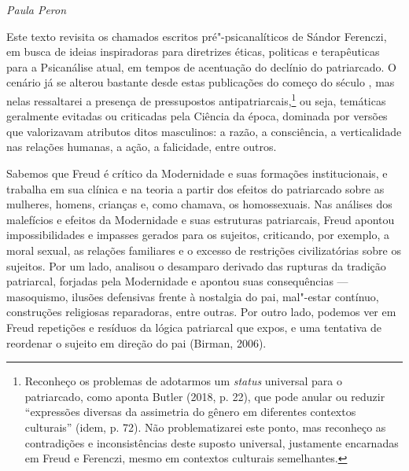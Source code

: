 \begin{flushright}
\emph{Paula Peron}
\end{flushright}

Este texto revisita os chamados escritos pré"-psicanalíticos de Sándor
Ferenczi, em busca de ideias inspiradoras para diretrizes éticas,
politicas e terapêuticas para a Psicanálise atual, em tempos de
acentuação do declínio do patriarcado. O cenário já se alterou bastante
desde estas publicações do começo do século , mas nelas ressaltarei a
presença de pressupostos antipatriarcais,\footnote{Reconheço os problemas
  de adotarmos um \emph{status} universal para o patriarcado, como
  aponta Butler (2018, p. 22), que pode anular ou reduzir ``expressões
  diversas da assimetria do gênero em diferentes contextos culturais''
  (idem, p. 72). Não problematizarei este ponto, mas reconheço as
  contradições e inconsistências deste suposto universal, justamente
  encarnadas em Freud e Ferenczi, mesmo em contextos culturais
  semelhantes.} ou seja, temáticas geralmente evitadas ou criticadas
pela Ciência da época, dominada por versões que valorizavam atributos
ditos masculinos: a razão, a consciência, a verticalidade nas relações
humanas, a ação, a falicidade, entre outros.

Sabemos que Freud é crítico da Modernidade e suas formações
institucionais, e trabalha em sua clínica e na teoria a partir dos
efeitos do patriarcado sobre as mulheres, homens, crianças e, como
chamava, os homossexuais. Nas análises dos malefícios e efeitos da
Modernidade e suas estruturas patriarcais, Freud apontou
impossibilidades e impasses gerados para os sujeitos, criticando, por
exemplo, a moral sexual, as relações familiares e o excesso de
restrições civilizatórias sobre os sujeitos. Por um lado, analisou o
desamparo derivado das rupturas da tradição patriarcal, forjadas pela
Modernidade e apontou suas consequências --- masoquismo, ilusões
defensivas frente à nostalgia do pai, mal"-estar contínuo, construções
religiosas reparadoras, entre outras. Por outro lado, podemos ver em
Freud repetições e resíduos da lógica patriarcal que expos, e uma
tentativa de reordenar o sujeito em direção do pai (Birman, 2006).

